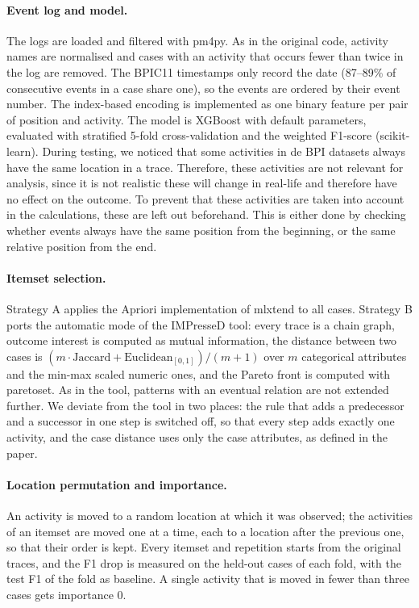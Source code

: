 \documentclass{article}
\begin{document}
\paragraph{Event log and model.}
The logs are loaded and filtered with pm4py. As in the original code, activity names are normalised and cases with an activity that occurs fewer than twice in the log are removed. The BPIC11 timestamps only record the date (87--89\% of consecutive events in a case share one), so the events are ordered by their event number. The index-based encoding is implemented as one binary feature per pair of position and activity. The model is XGBoost with default parameters, evaluated with stratified 5-fold cross-validation and the weighted F1-score (scikit-learn). During testing, we noticed that some activities in de BPI datasets always have the same location in a trace. Therefore, these activities are not relevant for analysis, since it is not realistic these will change in real-life and therefore have no effect on the outcome. To prevent that these activities are taken into account in the calculations, these are left out beforehand. This is either done by checking whether events always have the same position from the beginning, or the same relative position from the end.

\paragraph{Itemset selection.}
Strategy A applies the Apriori implementation of mlxtend to all cases. Strategy B ports the automatic mode of the IMPresseD tool: every trace is a chain graph, outcome interest is computed as mutual information, the distance between two cases is $(m \cdot \text{Jaccard} + \text{Euclidean}_{[0,1]})/(m+1)$ over $m$ categorical attributes and the min-max scaled numeric ones, and the Pareto front is computed with paretoset. As in the tool, patterns with an eventual relation are not extended further. We deviate from the tool in two places: the rule that adds a predecessor and a successor in one step is switched off, so that every step adds exactly one activity, and the case distance uses only the case attributes, as defined in the paper.

\paragraph{Location permutation and importance.}
An activity is moved to a random location at which it was observed; the activities of an itemset are moved one at a time, each to a location after the previous one, so that their order is kept. Every itemset and repetition starts from the original traces, and the F1 drop is measured on the held-out cases of each fold, with the test F1 of the fold as baseline. A single activity that is moved in fewer than three cases gets importance 0.
\end{document}
